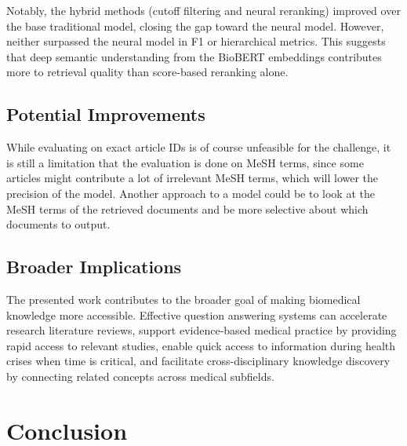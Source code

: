 \documentclass[12pt]{article}
\begin{document}
Notably, the hybrid methods (cutoff filtering and neural reranking) improved over the base traditional model, closing the gap toward the neural model. However, neither surpassed the neural model in F1 or hierarchical metrics. This suggests that deep semantic understanding from the BioBERT embeddings contributes more to retrieval quality than score-based reranking alone.


\subsection{Potential Improvements}

While evaluating on exact article IDs is of course unfeasible for the challenge, it is still a limitation that the evaluation is done on MeSH terms, since some articles might contribute a lot of irrelevant MeSH terms, which will lower the precision of the model. Another approach to a model could be to look at the MeSH terms of the retrieved documents and be more selective about which documents to output. 

\subsection{Broader Implications}

The presented work contributes to the broader goal of making biomedical knowledge more accessible. Effective question answering systems can accelerate research literature reviews, support evidence-based medical practice by providing rapid access to relevant studies, enable quick access to information during health crises when time is critical, and facilitate cross-disciplinary knowledge discovery by connecting related concepts across medical subfields.

\section{Conclusion}
\end{document}
